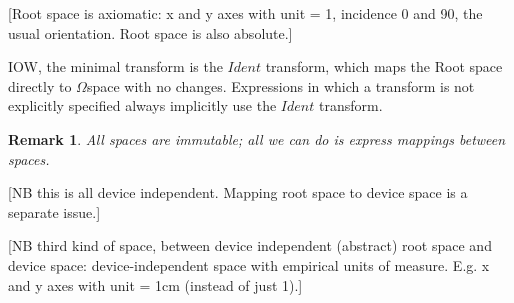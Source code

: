 \documentclass[reqno,12pt]{tufte-handout}
\numberwithin{equation}{subsection}
\numberwithin{equation}{subsection}
\newtheorem{remark}{Remark}
\newcommand\Omg{\(\Omega\)}
\begin{document}
[Root space is axiomatic: x and y axes with unit = 1, incidence 0 and
  90, the usual orientation.  Root space is also absolute.]

IOW, the minimal transform is the \(Ident\) transform, which maps the
Root space directly to \Omg space with no changes.  Expressions in
which a transform is not explicitly specified always implicitly use
the \(Ident\) transform.

\begin{remark}
  All spaces are immutable; all we can do is express mappings between spaces.
\end{remark}

[NB this is all device independent.  Mapping root space to device
  space is a separate issue.]

[NB third kind of space, between device independent (abstract) root
  space and device space: device-independent space with empirical units
  of measure.  E.g. x and y axes with unit = 1cm (instead of just 1).]

\clearpage
\end{document}
